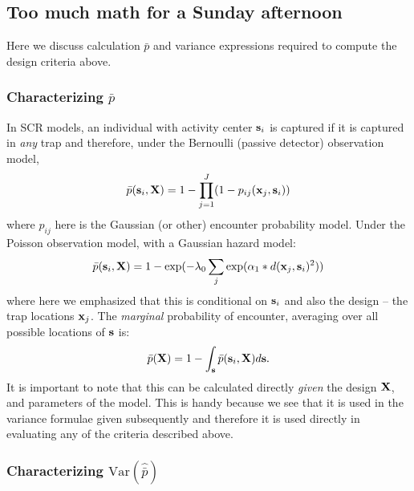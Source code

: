 \subsection{Too much math for a Sunday afternoon}

Here we discuss calculation $\bar{p}$ and variance expressions
required to compute the design criteria above. 

\subsubsection{Characterizing $\bar{p}$}

In SCR models, an individual with activity center ${\bf
  s}_{i}$ is captured if it is captured in {\it any} trap and
therefore, under the Bernoulli (passive detector) observation model,
\[
 \bar{p}({\bf s}_{i}, {\bf X}) = 1 - \prod_{j=1}^{J} (1- p_{ij}({\bf
   x}_{j}, {\bf s}_{i}))
\]
where $p_{ij}$ here is the Gaussian (or other) encounter probability model.
Under the Poisson observation model, with a Gaussian hazard model:
\[
 \bar{p}({\bf s}_{i},{\bf X}) = 1 -  \exp(-\lambda_{0} \sum_{j}
 \exp(\alpha_{1}* d({\bf x}_{j}, {\bf s}_{i})^2 ))
\]
where here we emphasized that this is conditional on ${\bf s}_{i}$ and
also the design -- the trap locations ${\bf x}_{j}$.  The {\it
  marginal} probability of encounter, averaging over all possible
locations of ${\bf s}$ is:
\begin{equation}
 \bar{p}({\bf X}) = 1 - \int_{\bf s}    \bar{p}({\bf s}_{i},{\bf X})    d{\bf s}.
\label{design.eq.pbar}
\end{equation}
It is important to note that this can be calculated directly {\it
  given} the design ${\bf X}$, and parameters of the model. This is
handy because we see that it is used in the variance formulae given
subsequently and therefore it is used directly in evaluating any of
the criteria described above.


\subsubsection{Characterizing $\mbox{Var}(\hat{\bar{p}})$}

